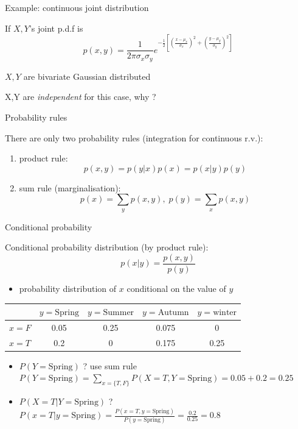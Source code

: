 \documentclass{scrartcl}
\def\tightlist{}
\begin{document}
\begin{frame}{Example: continuous joint distribution}
\protect\hypertarget{example-continuous-joint-distribution}{}

If \(X,Y\)'s joint p.d.f is
\[p(x,y) = \frac{1}{2\pi\sigma_x\sigma_y} e^{-\frac{1}{2}[(\frac{x-\mu_x}{\sigma_x})^2 +(\frac{y-\mu_y}{\sigma_y})^2] }\]

\(X,Y\) are bivariate Gaussian distributed

\bigskip

X,Y are \emph{independent} for this case, why ?

\end{frame}

\begin{frame}{Probability rules}
\protect\hypertarget{probability-rules}{}

There are only two probability rules (integration for continuous r.v.):

\begin{enumerate}
    \item product rule: \[ p(x, y) = p (y|x)p(x) = p(x|y)p(y)\]
    \item sum rule (marginalisation): \[ p (x) = \sum_y p(x, y),\; p(y) = \sum_x p(x, y)\]
\end{enumerate}

\end{frame}

\begin{frame}{Conditional probability}
\protect\hypertarget{conditional-probability}{}

Conditional probability distribution (by product rule):
\[p (x| y) = \frac{p(x, y)}{p(y)}\]

\begin{itemize}
\tightlist
\item
  probability distribution of \(x\) conditional on the value of \(y\)
\end{itemize}

\bigskip

\begin{table}\centering
\begin{tabular}{ l | c | c | c | c}
   \centering                    
   & $y=\text{Spring}$ & $y=\text{Summer}$ &$y=\text{Autumn}$ & $y=\text{winter}$\\ 
   \hline
  $x= F$ & 0.05 & 0.25 & 0.075& 0\\
    \hline 
  $x= T$ & 0.2 & 0 & 0.175& 0.25\\ 
\end{tabular}
\end{table}

\bigskip

\begin{itemize}
\item
  \(P(Y= \text{Spring})\) ? use sum rule
  \(P(Y = \text{Spring}) = \sum_{x=\{T,F\}} P(X=T,Y=\text{Spring}) =0.05+0.2=0.25\)
\item
  \(P(X=T | Y= \text{Spring})\) ?
  \(P(x=T | y = \text{Spring}) = \frac{P(x=T, y=\text{Spring})}{P(y=\text{Spring})}=\frac{0.2}{0.25}=0.8\)
\end{itemize}

\end{frame}
\end{document}

